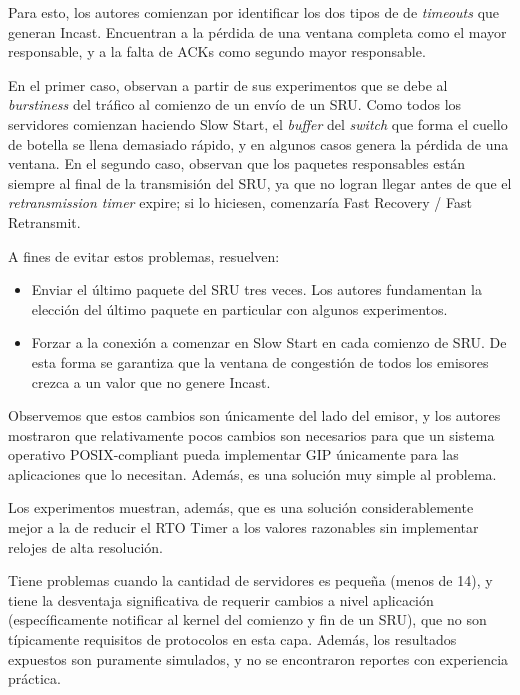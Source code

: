 \documentclass[runningheads,a4paper]{llncs}
\begin{document}
Para esto, los autores comienzan por identificar los dos tipos de de \textit{timeouts} que generan Incast. Encuentran a la pérdida de una ventana completa como el mayor responsable, y a la falta de ACKs como segundo mayor responsable. 

En el primer caso, observan a partir de sus experimentos que se debe al \textit{burstiness} del tráfico al comienzo de un envío de un SRU. Como todos los servidores comienzan haciendo Slow Start, el \textit{buffer} del \textit{switch} que forma el cuello de botella se llena demasiado rápido, y en algunos casos genera la pérdida de una ventana. En el segundo caso, observan que los paquetes responsables están siempre al final de la transmisión del SRU, ya que no logran llegar antes de que el \textit{retransmission timer} expire; si lo hiciesen, comenzaría Fast Recovery / Fast Retransmit.

A fines de evitar estos problemas, resuelven:

\begin{itemize}
    \item Enviar el último paquete del SRU tres veces. Los autores fundamentan la elección del último paquete en particular con algunos experimentos.
    
    \item Forzar a la conexión a comenzar en Slow Start en cada comienzo de SRU. De esta forma se garantiza que la ventana de congestión de todos los emisores crezca a un valor que no genere Incast.
\end{itemize}

Observemos que estos cambios son únicamente del lado del emisor, y los autores mostraron que relativamente pocos cambios son necesarios para que un sistema operativo POSIX-compliant pueda implementar GIP únicamente para las aplicaciones que lo necesitan. Además, es una solución muy simple al problema.

Los experimentos muestran, además, que es una solución considerablemente mejor a la de reducir el RTO Timer a los valores razonables sin implementar relojes de alta resolución.

Tiene problemas cuando la cantidad de servidores es pequeña (menos de 14), y tiene la desventaja significativa de requerir cambios a nivel aplicación (específicamente notificar al kernel del comienzo y fin de un SRU), que no son típicamente requisitos de protocolos en esta capa. Además, los resultados expuestos son puramente simulados, y no se encontraron reportes con experiencia práctica.
\end{document}
